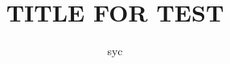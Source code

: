 \documentclass[a4paper, 12pt, fontset=windows, draft]{ctexbook}
\title{TITLE FOR TEST}
\author{syc}
\begin{document}
\def\makecover{
  \linespread{1.5}
  ~\newline
  \raisebox{3pt}{\texttt{[image: pic/hbu-logo.png]}}~~~~~~\texttt{[image: pic/hbu-title.png]}
  \newline
  \begin{table}[h]
    \songti
    \zihao{-4}
    \begin{tabular}{cl}
      \makebox[5em][s]{密\hspace{\fill}级：}                                 & 1 \\
      \makebox[5em][s]{分\hspace{\fill}类\hspace{\fill}号：}                 & 1 \\
      \makebox[5em][s]{学\hspace{\fill}校\hspace{\fill}代\hspace{\fill}码：} & 1 \\
      \makebox[5em][s]{学\hspace{\fill}号：}                                 & 1 \\
    \end{tabular}
  \end{table}
  \newline
  \vbox{
    \vskip2cm
    \noindent
    \heiti
    \zihao{-0}
    硕士学位论文
  }
  \newline
  \vbox{
    \vskip1.5cm
    \noindent
    \zihao{1}
    \FZXBSong
    \textbf{\@title}
  }
  \newline
  \vspace{\fill}
  \linespread{1.75}
  \begin{table}[h]
    \heiti
    \zihao{4}
    \begin{tabular}{cl}
      \makebox[6em][s]{学\hspace{\fill}位\hspace{\fill}申\hspace{\fill}请\hspace{\fill}人：} & 1 \\
      \makebox[6em][s]{指\hspace{\fill}导\hspace{\fill}教\hspace{\fill}师：}                 & 1 \\
      \makebox[6em][s]{学\hspace{\fill}位\hspace{\fill}类\hspace{\fill}别：}                 & 1 \\

\end{tabular}
\end{table}}
\end{document}
